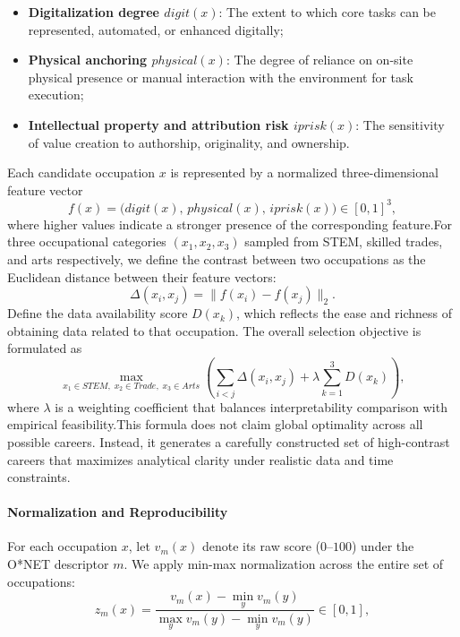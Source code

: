 \begin{itemize}
    \item \textbf{Digitalization degree $digit(x)$}: The extent to which core tasks can be represented, automated, or enhanced digitally;
    \item \textbf{Physical anchoring $physical(x)$}: The degree of reliance on on-site physical presence or manual interaction with the environment for task execution;
    \item \textbf{Intellectual property and attribution risk $iprisk(x)$}: The sensitivity of value creation to authorship, originality, and ownership.
\end{itemize}Each candidate occupation $x$ is represented by a normalized three-dimensional feature vector
\begin{equation}
    f(x)=\big(digit(x),\,physical(x),\,iprisk(x)\big)\in[0,1]^3,
\end{equation}
where higher values indicate a stronger presence of the corresponding feature.For three occupational categories $(x_1,x_2,x_3)$ sampled from STEM, skilled trades, and arts respectively, we define the contrast between two occupations as the Euclidean distance between their feature vectors:
\begin{equation}
    \Delta(x_i,x_j)=\lVert f(x_i)-f(x_j)\rVert_2.
\end{equation}Define the data availability score \(D(x_k)\), which reflects the ease and richness of obtaining data related to that occupation. The overall selection objective is formulated as  
\begin{equation}  
    \max_{x_1\in STEM,\;x_2\in Trade,\;x_3\in Arts}  
    \left(  
    \sum_{i<j}\Delta(x_i,x_j)  
    +\lambda\sum_{k=1}^{3}D(x_k)  
    \right),  
\end{equation}  
where \(\lambda\) is a weighting coefficient that balances interpretability comparison with empirical feasibility.This formula does not claim global optimality across all possible careers.  
Instead, it generates a carefully constructed set of high-contrast careers that maximizes analytical clarity under realistic data and time constraints.\paragraph{Normalization and Reproducibility}For each occupation $x$, let $v_m(x)$ denote its raw score ($0$--$100$) under the O*NET descriptor $m$.
We apply min-max normalization across the entire set of occupations:
\begin{equation}
    z_m(x)=\frac{v_m(x)-\min_{y}v_m(y)}{\max_{y}v_m(y)-\min_{y}v_m(y)} \in [0,1],
\end{equation}
